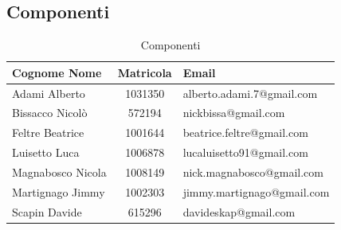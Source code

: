 \subsection{Componenti}
\begin{table}[!h]
	\centering
	\begin{tabular}{|l|c|l|}
	\hline
	Cognome Nome & Matricola & Email\\ \hline
	Adami Alberto &1031350  & alberto.adami.7@gmail.com \\
	Bissacco Nicolò &572194&nickbissa@gmail.com  \\
	Feltre Beatrice &1001644 &beatrice.feltre@gmail.com \\
	Luisetto Luca &1006878&lucaluisetto91@gmail.com \\
	Magnabosco Nicola &1008149  &nick.magnabosco@gmail.com \\
	Martignago Jimmy &1002303&jimmy.martignago@gmail.com \\
	Scapin Davide &615296&davideskap@gmail.com\\ \hline
	\end{tabular}
	\caption{Componenti}
\end{table}
